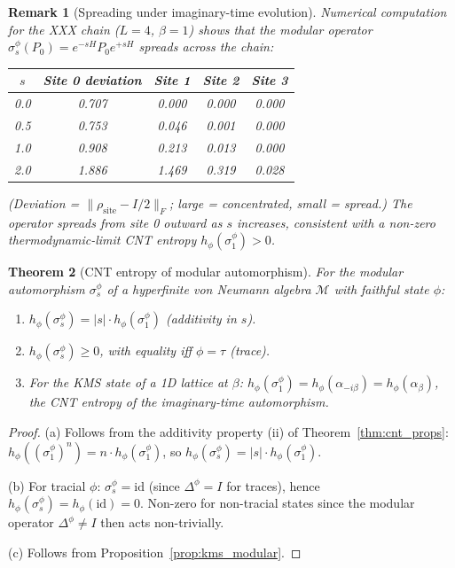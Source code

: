 \documentclass[12pt,a4paper]{article}
\newtheorem{theorem}{Theorem}[section]
\newtheorem{remark}[theorem]{Remark}
\newcommand{\vN}{\mathcal{M}}      %
\newcommand{\norm}[1]{\lVert #1 \rVert}
\begin{document}
\begin{remark}[Spreading under imaginary-time evolution]\label{rmk:spread_imag}
Numerical computation for the XXX chain ($L=4$, $\beta=1$) shows that the modular
operator $\sigma_s^\phi(P_0)=e^{-sH}P_0 e^{+sH}$ spreads across the chain:
\begin{center}
\begin{tabular}{@{}ccccc@{}}
\toprule
$s$ & Site 0 deviation & Site 1 & Site 2 & Site 3 \\
\midrule
0.0 & 0.707 & 0.000 & 0.000 & 0.000 \\
0.5 & 0.753 & 0.046 & 0.001 & 0.000 \\
1.0 & 0.908 & 0.213 & 0.013 & 0.000 \\
2.0 & 1.886 & 1.469 & 0.319 & 0.028 \\
\bottomrule
\end{tabular}
\end{center}
(Deviation = $\norm{\rho_{\mathrm{site}}-I/2}_F$; large = concentrated, small = spread.)
The operator spreads from site 0 outward as $s$ increases, consistent with a non-zero
thermodynamic-limit CNT entropy $h_\phi(\sigma^\phi_1)>0$.
\end{remark}

\begin{theorem}[CNT entropy of modular automorphism]\label{thm:cnt_modular}
For the modular automorphism $\sigma^\phi_s$ of a hyperfinite von Neumann algebra $\vN$
with faithful state $\phi$:
\begin{enumerate}
\item[(a)] $h_\phi(\sigma^\phi_s)=|s|\cdot h_\phi(\sigma^\phi_1)$ (additivity in $s$).
\item[(b)] $h_\phi(\sigma^\phi_s)\ge 0$, with equality iff $\phi=\tau$ (trace).
\item[(c)] For the KMS state of a 1D lattice at $\beta$:
  $h_\phi(\sigma^\phi_1)=h_\phi(\alpha_{-i\beta})=h_\phi(\alpha_\beta)$,
  the CNT entropy of the imaginary-time automorphism.
\end{enumerate}
\end{theorem}

\begin{proof}
(a) Follows from the additivity property (ii) of Theorem~\ref{thm:cnt_props}:
$h_\phi((\sigma^\phi_1)^n)=n\cdot h_\phi(\sigma^\phi_1)$, so $h_\phi(\sigma^\phi_s)=|s|\cdot h_\phi(\sigma^\phi_1)$.

(b) For tracial $\phi$: $\sigma^\phi_s=\mathrm{id}$ (since $\Delta^\phi=I$ for traces),
hence $h_\phi(\sigma^\phi_s)=h_\phi(\mathrm{id})=0$.  Non-zero for non-tracial states
since the modular operator $\Delta^\phi\ne I$ then acts non-trivially.

(c) Follows from Proposition~\ref{prop:kms_modular}.
\end{proof}
\end{document}
